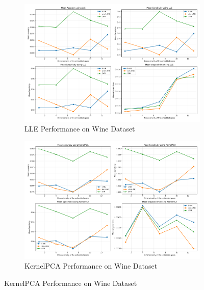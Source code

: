 \documentclass[12pt,a4paper]{article}
\begin{document}
\begin{figure}[H]
    \centering
    \begin{subfigure}[b]{0.48\textwidth}
        \includegraphics[width=\textwidth]{../python/results/plots/Mean_Results_LLE_Data_Wine.pdf}
        \caption{LLE Performance on Wine Dataset}
        \label{fig:lle_wine}
    \end{subfigure}
    \hfill
    \begin{subfigure}[b]{0.48\textwidth}
        \includegraphics[width=\textwidth]{../python/results/plots/Mean_Results_KernelPCA_Data_Wine.pdf}
        \caption{KernelPCA Performance on Wine Dataset}
        \label{fig:kernelpca_wine}
    \end{subfigure}
    

\end{figure}
\end{document}
